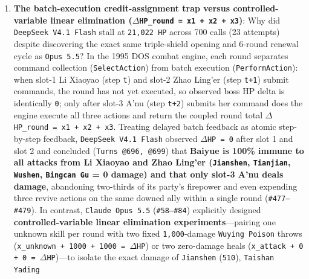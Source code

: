 \documentclass[11pt,a4paper]{article}
\begin{document}
\begin{enumerate}
\item \textbf{The batch-execution credit-assignment trap versus controlled-variable linear elimination (\texttt{\ensuremath{\Delta}HP\allowbreak{}\_\allowbreak{}round\allowbreak{} \allowbreak{}=\allowbreak{} \allowbreak{}x1\allowbreak{} \allowbreak{}+\allowbreak{} \allowbreak{}x2\allowbreak{} \allowbreak{}+\allowbreak{} \allowbreak{}x3})}: Why did \texttt{DeepSeek\allowbreak{} \allowbreak{}V4\allowbreak{}.\allowbreak{}1\allowbreak{} \allowbreak{}Flash} stall at \texttt{21\allowbreak{},\allowbreak{}022\allowbreak{} \allowbreak{}HP} across 700 calls (23 attempts) despite discovering the exact same triple-shield opening and 6-round renewal cycle as \texttt{Opus\allowbreak{} \allowbreak{}5\allowbreak{}.\allowbreak{}5}? In the 1995 DOS combat engine, each round separates command collection (\texttt{SelectAc\allowbreak{}tion}) from batch execution (\texttt{PerformA\allowbreak{}ction}): when slot-1 Li Xiaoyao (step \texttt{t}) and slot-2 Zhao Ling'er (step \texttt{t+1}) submit commands, the round has not yet executed, so observed boss HP delta is identically \texttt{0}; only after slot-3 A'nu (step \texttt{t+2}) submits her command does the engine execute all three actions and return the coupled round total \texttt{\ensuremath{\Delta}HP\allowbreak{}\_\allowbreak{}round\allowbreak{} \allowbreak{}=\allowbreak{} \allowbreak{}x1\allowbreak{} \allowbreak{}+\allowbreak{} \allowbreak{}x2\allowbreak{} \allowbreak{}+\allowbreak{} \allowbreak{}x3}. Treating delayed batch feedback as atomic step-by-step feedback, \texttt{DeepSeek\allowbreak{} \allowbreak{}V4\allowbreak{}.\allowbreak{}1\allowbreak{} \allowbreak{}Flash} observed \texttt{\ensuremath{\Delta}HP\allowbreak{} \allowbreak{}=\allowbreak{} \allowbreak{}0} after slot 1 and slot 2 and concluded (\texttt{Turns\allowbreak{} \allowbreak{}@696\allowbreak{},\allowbreak{} \allowbreak{}@699}) that \textbf{Baiyue is 100\% immune to all attacks from Li Xiaoyao and Zhao Ling'er (\texttt{Jianshen}, \texttt{Tianjian}, \texttt{Wushen}, \texttt{Bingcan\allowbreak{} \allowbreak{}Gu} = 0 damage) and that only slot-3 A'nu deals damage}, abandoning two-thirds of its party's firepower and even expending three revive actions on the same downed ally within a single round (\texttt{\#477--\#479}). In contrast, \texttt{Claude\allowbreak{} \allowbreak{}Opus\allowbreak{} \allowbreak{}5\allowbreak{}.\allowbreak{}5} (\texttt{\#58--\#84}) explicitly designed \textbf{controlled-variable linear elimination experiments}---pairing one unknown skill per round with two fixed \texttt{1\allowbreak{},\allowbreak{}000}-damage \texttt{Wuying\allowbreak{} \allowbreak{}Poison} throws (\texttt{x\allowbreak{}\_\allowbreak{}unknown\allowbreak{} \allowbreak{}+\allowbreak{} \allowbreak{}1000\allowbreak{} \allowbreak{}+\allowbreak{} \allowbreak{}1000\allowbreak{} \allowbreak{}=\allowbreak{} \allowbreak{}\ensuremath{\Delta}HP}) or two zero-damage heals (\texttt{x\allowbreak{}\_\allowbreak{}attack\allowbreak{} \allowbreak{}+\allowbreak{} \allowbreak{}0\allowbreak{} \allowbreak{}+\allowbreak{} \allowbreak{}0\allowbreak{} \allowbreak{}=\allowbreak{} \allowbreak{}\ensuremath{\Delta}HP})---to isolate the exact damage of \texttt{Jianshen} (\texttt{510}), \texttt{Taishan\allowbreak{} \allowbreak{}Yading} 
\end{enumerate}
\end{document}
